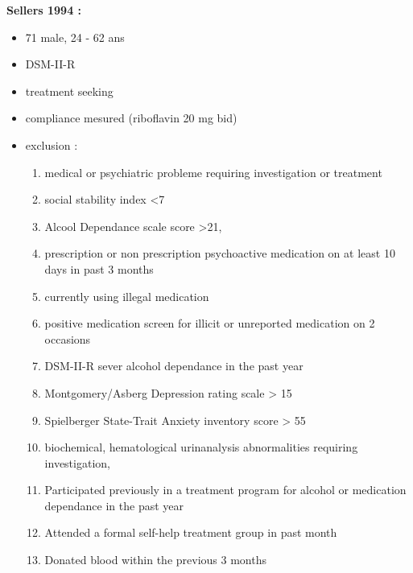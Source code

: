 \documentclass[twocolumn]{article}
\begin{document}
\textbf{Sellers 1994 :}
\begin{itemize}
\item 71 male, 24 - 62 ans
\item DSM-II-R
\item treatment seeking
\item compliance mesured (riboflavin 20 mg bid)
\item exclusion : 
\begin{enumerate}
\item medical or psychiatric probleme requiring investigation or treatment
\item social stability index <7
\item Alcool Dependance scale score >21,
\item prescription or non prescription psychoactive medication on at least 10 days in past 3 months
\item currently using illegal medication
\item positive medication screen for illicit or unreported medication on 2 occasions
\item DSM-II-R sever alcohol dependance in the past year
\item Montgomery/Asberg Depression rating scale > 15
\item Spielberger State-Trait Anxiety inventory score > 55
\item biochemical, hematological urinanalysis abnormalities requiring investigation,
\item Participated previously in a treatment program for alcohol or medication dependance in the past year
\item Attended a formal self-help treatment group in past month
\item Donated blood within the previous 3 months
\end{enumerate}

\end{itemize}
\end{document}
